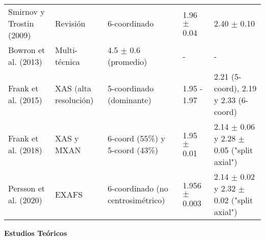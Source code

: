 \begin{sidewaystable}
{\begin{tabular}{@{}lllll@{}}
        Smirnov y Trostin (2009)& Revisión                & 6-coordinado                           & 1.96 $\pm$ 0.04                      & 2.40 $\pm$ 0.10                                 \\
        Bowron et al. (2013)    & Multi-técnica           & 4.5 $\pm$ 0.6 (promedio)               & -                                    & -                                               \\
        Frank et al. (2015)     & XAS (alta resolución)   & 5-coordinado (dominante)               & 1.95 - 1.97                          & 2.21 (5-coord), 2.19 y 2.33 (6-coord)           \\
        Frank et al. (2018)     & XAS y MXAN              & 6-coord (55\%) y 5-coord (43\%)        & 1.95 $\pm$ 0.01                      & 2.14 $\pm$ 0.06 y 2.28 $\pm$ 0.05 ("split axial") \\
        Persson et al. (2020)   & EXAFS                   & 6-coordinado (no centrosimétrico)      & 1.956 $\pm$ 0.003                    & 2.14 $\pm$ 0.02 y 2.32 $\pm$ 0.02 ("split axial") \\
        \bottomrule
    \end{tabular}

    \vspace{8mm} %

    \textbf{Estudios Teóricos}
    \vspace{2mm} %

}
\end{sidewaystable}
